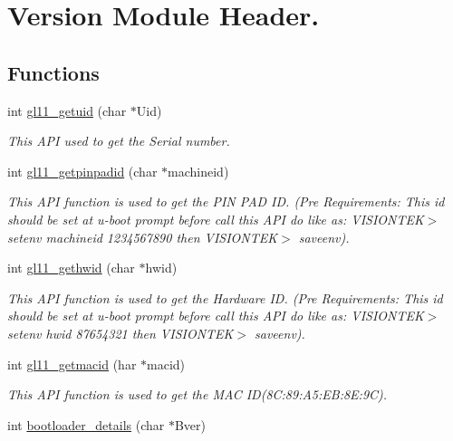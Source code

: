 \hypertarget{group__L}{\section{Version Module Header.}
\label{group__L}
}
\subsection*{Functions}
\begin{DoxyCompactItemize}
\item 
int \hyperlink{group__L_ga187e392e64bf6cb327f0bcb839d3d40f}{gl11\+\_\+getuid} (char $\ast$Uid)
\begin{DoxyCompactList}\small\item\em This A\+P\+I used to get the Serial number. \end{DoxyCompactList}\item 
int \hyperlink{group__L_gaf29deab5e8615c18227b76d0795c2704}{gl11\+\_\+getpinpadid} (char $\ast$machineid)
\begin{DoxyCompactList}\small\item\em This A\+P\+I function is used to get the P\+I\+N P\+A\+D I\+D. (Pre Requirements\+: This id should be set at u-\/boot prompt before call this A\+P\+I do like as\+: V\+I\+S\+I\+O\+N\+T\+E\+K$>$ setenv machineid 1234567890 then V\+I\+S\+I\+O\+N\+T\+E\+K$>$ saveenv). \end{DoxyCompactList}\item 
int \hyperlink{group__L_gad69ff9042b0c39abde1b0827fe7b8f98}{gl11\+\_\+gethwid} (char $\ast$hwid)
\begin{DoxyCompactList}\small\item\em This A\+P\+I function is used to get the Hardware I\+D. (Pre Requirements\+: This id should be set at u-\/boot prompt before call this A\+P\+I do like as\+: V\+I\+S\+I\+O\+N\+T\+E\+K$>$ setenv hwid 87654321 then V\+I\+S\+I\+O\+N\+T\+E\+K$>$ saveenv). \end{DoxyCompactList}\item 
int \hyperlink{group__L_gae33abc02e4e0c66cbf543366837c966c}{gl11\+\_\+getmacid} (har $\ast$macid)
\begin{DoxyCompactList}\small\item\em This A\+P\+I function is used to get the M\+A\+C I\+D(8\+C\+:89\+:\+A5\+:\+E\+B\+:8\+E\+:9\+C). \end{DoxyCompactList}\item 
int \hyperlink{group__L_ga929263cb027bb7f7acf33302051b073e}{bootloader\+\_\+details} (char $\ast$Bver)

\end{DoxyCompactItemize}
